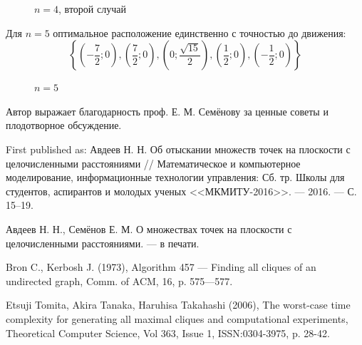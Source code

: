 \documentclass{article}
\begin{document}
\begin{figure}[h]
\caption{$n=4$, второй случай}
\label{ris:image}
\end{figure}

Для $n=5$ оптимальное расположение единственно с точностью до движения:
$$
\left\{\left( -\frac{7}{2} ; 0\right),\left( \frac{7}{2} ; 0\right),\left( 0 ; \frac{\sqrt{15}}{2}\right),\left( \frac{1}{2} ; 0\right),\left( -\frac{1}{2} ; 0\right)\right\}
$$


\begin{figure}[h]
\caption{$n=5$}
\label{ris:image}
\end{figure}



Автор выражает благодарность проф. Е. М. Семёнову за ценные советы и плодотворное обсуждение.



\small{
	First published as:
	Авдеев Н. Н.
	Об отыскании множеств точек на плоскости с целочисленными расстояниями
	// Математическое и компьютерное моделирование,
	информационные технологии управления: Сб. тр. Школы для студентов,
	аспирантов и молодых ученых <<МКМИТУ-2016>>. --- 2016. --- С. 15--19.
}



\begin{thebibliography}{99}

 Авдеев Н. Н., Семёнов Е. М. О множествах точек на плоскости с целочисленными расстояниями. --- в печати.

 Bron C., Kerbosh J. (1973), Algorithm 457 — Finding all cliques of an undirected graph, Comm. of ACM, 16, p. 575—577.

 Etsuji Tomita, Akira Tanaka, Haruhisa Takahashi (2006), The worst-case time complexity for generating all maximal cliques and computational experiments, Theoretical Computer Science, Vol 363, Issue 1, ISSN:0304-3975, p. 28-42.

\end{thebibliography}
\end{document}
